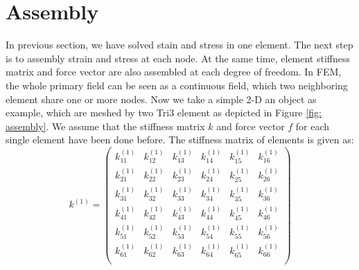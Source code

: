 \section{Assembly}
In previous section, we have solved stain and stress in one element. The next step is to assembly strain and stress at each node. At the same time, element stiffness matrix and force vector are also assembled at each degree of freedom. In FEM, the whole primary field can be seen as a continuous field, which two neighboring element share one or more nodes. Now we take a simple 2-D an object as example, which are meshed by two Tri3 element as depicted in Figure \ref{fig: assembly}. We assume that the stiffness matrix $k$ and force vector $f$ for each single element have been done before. The stiffness matrix of elements is given as:
\begin{equation}
k^{\left(1\right)} = \begin{pmatrix}
k_{11}^{\left(1\right)} & k_{12}^{\left(1\right)} &  k_{13}^{\left(1\right)} &  k_{14}^{\left(1\right)} & k_{15}^{\left(1\right)}  & k_{16}^{\left(1\right)}   \\[0.3em]
k_{21}^{\left(1\right)} & k_{22}^{\left(1\right)} &  k_{23}^{\left(1\right)} &  k_{24}^{\left(1\right)} & k_{25}^{\left(1\right)}  & k_{26}^{\left(1\right)}   \\[0.3em]
k_{31}^{\left(1\right)} & k_{32}^{\left(1\right)} &  k_{33}^{\left(1\right)} &  k_{34}^{\left(1\right)} & k_{35}^{\left(1\right)}  & k_{36}^{\left(1\right)}   \\[0.3em]
k_{41}^{\left(1\right)} & k_{42}^{\left(1\right)} &  k_{43}^{\left(1\right)} &  k_{44}^{\left(1\right)} & k_{45}^{\left(1\right)}  & k_{46}^{\left(1\right)}   \\[0.3em]
k_{51}^{\left(1\right)} & k_{52}^{\left(1\right)} &  k_{53}^{\left(1\right)} &  k_{54}^{\left(1\right)} & k_{55}^{\left(1\right)}  & k_{56}^{\left(1\right)}   \\[0.3em]
k_{61}^{\left(1\right)} & k_{62}^{\left(1\right)} &  k_{63}^{\left(1\right)} &  k_{64}^{\left(1\right)} & k_{65}^{\left(1\right)}  & k_{66}^{\left(1\right)}   \\[0.3em]
\end{pmatrix} 
\end{equation}	

